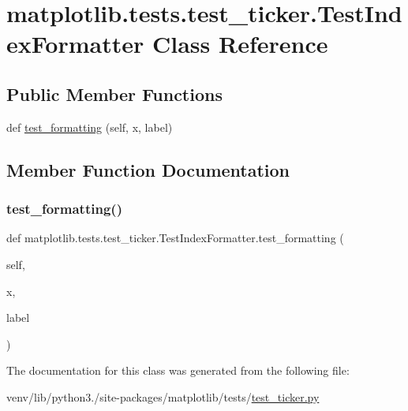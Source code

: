 \hypertarget{classmatplotlib_1_1tests_1_1test__ticker_1_1TestIndexFormatter}{}\section{matplotlib.\+tests.\+test\+\_\+ticker.\+Test\+Index\+Formatter Class Reference}
\label{classmatplotlib_1_1tests_1_1test__ticker_1_1TestIndexFormatter}
\subsection*{Public Member Functions}
\begin{DoxyCompactItemize}
\item 
def \hyperlink{classmatplotlib_1_1tests_1_1test__ticker_1_1TestIndexFormatter_a2efd5c21bedbcae07b1a2f0bd2738681}{test\+\_\+formatting} (self, x, label)
\end{DoxyCompactItemize}


\subsection{Member Function Documentation}
\mbox{\label{classmatplotlib_1_1tests_1_1test__ticker_1_1TestIndexFormatter_a2efd5c21bedbcae07b1a2f0bd2738681}} 
\subsubsection{\texorpdfstring{test\+\_\+formatting()}{test\_formatting()}}
{\footnotesize\ttfamily def matplotlib.\+tests.\+test\+\_\+ticker.\+Test\+Index\+Formatter.\+test\+\_\+formatting (\begin{DoxyParamCaption}\item[{}]{self,  }\item[{}]{x,  }\item[{}]{label }\end{DoxyParamCaption})}



The documentation for this class was generated from the following file\+:\begin{DoxyCompactItemize}
\item 
venv/lib/python3./site-\/packages/matplotlib/tests/\hyperlink{test__ticker_8py}{test\+\_\+ticker.\+py}\end{DoxyCompactItemize}
